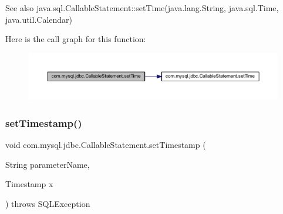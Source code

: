 \begin{DoxySeeAlso}{See also}
java.\+sql.\+Callable\+Statement\+::set\+Time(java.\+lang.\+String, java.\+sql.\+Time, java.\+util.\+Calendar) 
\end{DoxySeeAlso}
Here is the call graph for this function\+:\nopagebreak
\begin{figure}[H]
\begin{center}
\leavevmode
\includegraphics[width=350pt]{classcom_1_1mysql_1_1jdbc_1_1_callable_statement_a9295718be5a4fc486123ab0254a4b18e_cgraph}
\end{center}
\end{figure}
\mbox{\label{classcom_1_1mysql_1_1jdbc_1_1_callable_statement_a09f76d55b898a951fb5a754781c859ee}} 
\subsubsection{\texorpdfstring{set\+Timestamp()}{setTimestamp()}\hspace{0.1cm}{\footnotesize\ttfamily [1/2]}}
{\footnotesize\ttfamily void com.\+mysql.\+jdbc.\+Callable\+Statement.\+set\+Timestamp (\begin{DoxyParamCaption}\item[{String}]{parameter\+Name,  }\item[{Timestamp}]{x }\end{DoxyParamCaption}) throws S\+Q\+L\+Exception}

